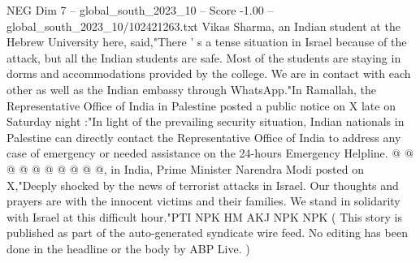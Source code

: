 \begin{textsample}{NEG Dim 7 – global\_south\_2023\_10 – Score -1.00 – global\_south\_2023\_10/102421263.txt}
Vikas Sharma, an Indian student at the Hebrew University here, said,"There ' s a tense situation in Israel because of the attack, but all the Indian students are safe.
Most of the students are staying in dorms and accommodations provided by the college.
We are in contact with each other as well as the Indian embassy through WhatsApp."In Ramallah, the Representative Office of India in Palestine posted a public notice on X late on Saturday night :"In light of the prevailing security situation, Indian nationals in Palestine can directly contact the Representative Office of India to address any case of emergency or needed assistance on the 24-hours Emergency Helpline. @ @ @ @ @ @ @ @ @ @, in India, Prime Minister Narendra Modi posted on X,"Deeply shocked by the news of terrorist attacks in Israel.
Our thoughts and prayers are with the innocent victims and their families.
We stand in solidarity with Israel at this difficult hour."PTI NPK HM AKJ NPK NPK ( This story is published as part of the auto-generated syndicate wire feed.
No editing has been done in the headline or the body by ABP Live. )

\end{textsample}
